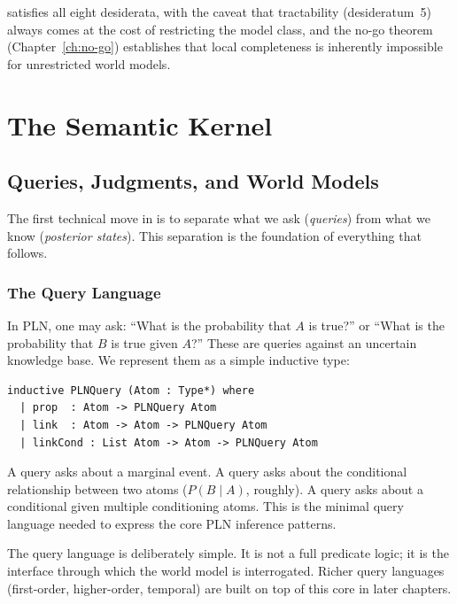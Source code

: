 \documentclass[11pt,openany]{report}
\begin{document}
\xiPLN{} satisfies all eight desiderata, with the caveat that tractability
(desideratum~5) always comes at the cost of restricting the model class, and
the no-go theorem (Chapter~\ref{ch:no-go}) establishes that local
completeness is inherently impossible for unrestricted world models.


\part{The Semantic Kernel}
\label{part:kernel}

\chapter{Queries, Judgments, and World Models}
\label{ch:queries}

The first technical move in \xiPLN{} is to separate what we ask
(\emph{queries}) from what we know (\emph{posterior states}).  This
separation is the foundation of everything that follows.

\section{The Query Language}

In PLN, one may ask: ``What is the probability that $A$ is true?''
or ``What is the probability that $B$ is true given $A$?''  These are
queries against an uncertain knowledge base.  We represent them as a
simple inductive type:

\begin{lstlisting}
inductive PLNQuery (Atom : Type*) where
  | prop  : Atom -> PLNQuery Atom
  | link  : Atom -> Atom -> PLNQuery Atom
  | linkCond : List Atom -> Atom -> PLNQuery Atom
\end{lstlisting}

A  query asks about a marginal event.  A  query asks
about the conditional relationship between two atoms ($P(B \mid A)$, roughly).
A  query asks about a conditional given multiple conditioning
atoms.  This is the minimal query language needed to express the core PLN
inference patterns.

The query language is deliberately simple.  It is not a full predicate logic;
it is the interface through which the world model is interrogated.  Richer
query languages (first-order, higher-order, temporal) are built on top of
this core in later chapters.
\end{document}
